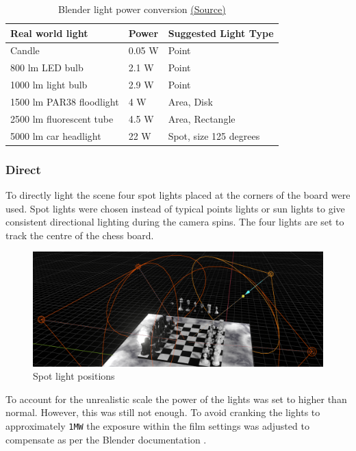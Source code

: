 \documentclass[11pt]{article}
\begin{document}
\begin{table}[htbp]
\caption{Blender light power conversion \href{https://docs.blender.org/manual/en/latest/render/lights/light\_object.html\#power-of-lights}{(Source)}}
\centering
\begin{tabular}{lll}
\hline
\textbf{Real world light} & \textbf{Power} & \textbf{Suggested Light Type}\\
\hline
Candle & 0.05 W & Point\\
\hline
800 lm LED bulb & 2.1 W & Point\\
\hline
1000 lm light bulb & 2.9 W & Point\\
\hline
1500 lm PAR38 floodlight & 4 W & Area, Disk\\
\hline
2500 lm fluorescent tube & 4.5 W & Area, Rectangle\\
\hline
5000 lm car headlight & 22 W & Spot, size 125 degrees\\
\hline
\end{tabular}
\end{table}

\subsubsection{Direct}
\label{sec:orgd76b4cc}
To directly light the scene four spot lights placed at the corners of the board
were used. Spot lights were chosen instead of typical points lights or sun
lights to give consistent directional lighting during the camera spins. The four
lights are set to track the centre of the chess board.
\begin{figure}[htbp]
\centering
\includegraphics[width=\textwidth]{Images/lighting.png}
\caption{Spot light positions}
\end{figure}
To account for the unrealistic scale the power of the lights was set to higher
than normal. However, this was still not enough. To avoid cranking the lights
to approximately \texttt{1MW} the exposure within the film settings was adjusted to
compensate as per the Blender documentation \cite{light-power-docs}.
\end{document}
